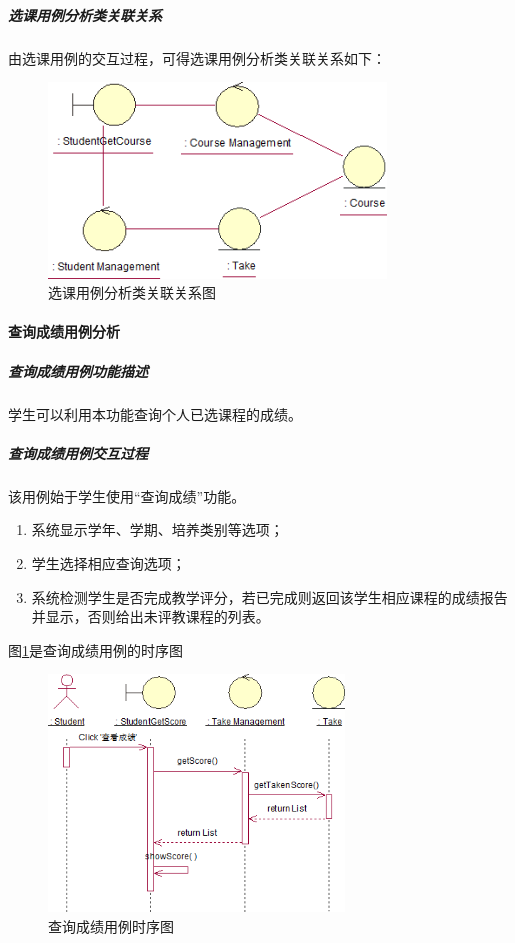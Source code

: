 \subparagraph{选课用例分析类关联关系}
由选课用例的交互过程，可得选课用例分析类关联关系如下：
\begin{figure}[H]
  \centering
  \includegraphics[width=0.8\textwidth]{img/selectcourse_depend}
  \caption{选课用例分析类关联关系图}
\end{figure}
  
\paragraph{查询成绩用例分析}
\subparagraph{查询成绩用例功能描述}

学生可以利用本功能查询个人已选课程的成绩。
    
\subparagraph{查询成绩用例交互过程}
    
该用例始于学生使用“查询成绩”功能。
\begin{enumerate}
  \item 系统显示学年、学期、培养类别等选项；
  \item 学生选择相应查询选项；
  \item 系统检测学生是否完成教学评分，若已完成则返回该学生相应课程的成绩报告并显示，否则给出未评教课程的列表。
\end{enumerate}
    
图\ref{fig:query_achievement_sequence}是查询成绩用例的时序图
\begin{figure}
  \centering
  \includegraphics[width=0.7\textwidth]{img/query_achievement_sequence}
  \caption{查询成绩用例时序图}
  \label{fig:query_achievement_sequence}
\end{figure}
    
